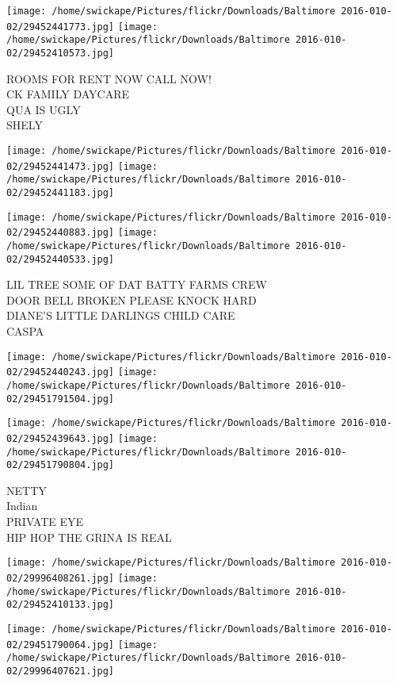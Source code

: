 \documentclass[10pt,letterpaper]{article}
\begin{document}
\texttt{[image: /home/swickape/Pictures/flickr/Downloads/Baltimore 2016-010-02/29452441773.jpg]}
\texttt{[image: /home/swickape/Pictures/flickr/Downloads/Baltimore 2016-010-02/29452410573.jpg]}

ROOMS FOR RENT NOW CALL NOW!\\
CK FAMILY DAYCARE\\
QUA IS UGLY\\
SHELY\\
\pagebreak

\texttt{[image: /home/swickape/Pictures/flickr/Downloads/Baltimore 2016-010-02/29452441473.jpg]}
\texttt{[image: /home/swickape/Pictures/flickr/Downloads/Baltimore 2016-010-02/29452441183.jpg]}

\texttt{[image: /home/swickape/Pictures/flickr/Downloads/Baltimore 2016-010-02/29452440883.jpg]}
\texttt{[image: /home/swickape/Pictures/flickr/Downloads/Baltimore 2016-010-02/29452440533.jpg]}

LIL TREE SOME OF DAT BATTY FARMS CREW\\
DOOR BELL BROKEN PLEASE KNOCK HARD\\
DIANE'S LITTLE DARLINGS CHILD CARE\\
CASPA\\
\pagebreak

\texttt{[image: /home/swickape/Pictures/flickr/Downloads/Baltimore 2016-010-02/29452440243.jpg]}
\texttt{[image: /home/swickape/Pictures/flickr/Downloads/Baltimore 2016-010-02/29451791504.jpg]}

\texttt{[image: /home/swickape/Pictures/flickr/Downloads/Baltimore 2016-010-02/29452439643.jpg]}
\texttt{[image: /home/swickape/Pictures/flickr/Downloads/Baltimore 2016-010-02/29451790804.jpg]}

NETTY\\
Indian\\
PRIVATE EYE\\
HIP HOP THE GRINA IS REAL\\
\pagebreak

\texttt{[image: /home/swickape/Pictures/flickr/Downloads/Baltimore 2016-010-02/29996408261.jpg]}
\texttt{[image: /home/swickape/Pictures/flickr/Downloads/Baltimore 2016-010-02/29452410133.jpg]}

\texttt{[image: /home/swickape/Pictures/flickr/Downloads/Baltimore 2016-010-02/29451790064.jpg]}
\texttt{[image: /home/swickape/Pictures/flickr/Downloads/Baltimore 2016-010-02/29996407621.jpg]}
\end{document}
